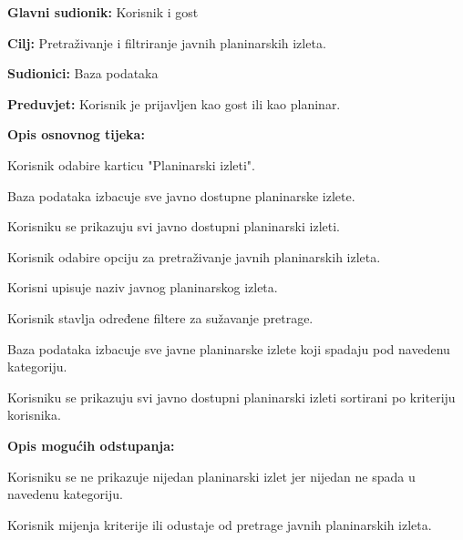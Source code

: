 		\noindent {}
		\begin{packed_item}
			
			\item \textbf{Glavni sudionik: } Korisnik i gost
			\item  \textbf{Cilj:} Pretraživanje i filtriranje javnih planinarskih izleta.
			\item  \textbf{Sudionici:} Baza podataka
			\item  \textbf{Preduvjet:} Korisnik je prijavljen kao gost ili kao planinar.
			\item  \textbf{Opis osnovnog tijeka:}
			
			\item[] \begin{packed_enum}
				
				\item Korisnik odabire karticu "Planinarski izleti".
				\item Baza podataka izbacuje sve javno dostupne planinarske izlete.
				\item Korisniku se prikazuju svi javno dostupni planinarski izleti.
				\item Korisnik odabire opciju za pretraživanje javnih planinarskih izleta.
				\item Korisni upisuje naziv javnog planinarskog izleta.
				\item Korisnik stavlja određene filtere za sužavanje pretrage.
				\item Baza podataka izbacuje sve javne planinarske izlete koji spadaju pod navedenu kategoriju.
				\item Korisniku se prikazuju svi javno dostupni planinarski izleti sortirani po kriteriju korisnika.
				
			\end{packed_enum}
			
			\item	\textbf{Opis mogućih odstupanja:}
			
			\item[] \begin{packed_item}
				
				\item[8.a] Korisniku se ne prikazuje nijedan planinarski izlet jer nijedan ne spada u navedenu kategoriju.
				\item[] \begin{packed_enum}
					
					\item Korisnik mijenja kriterije ili odustaje od pretrage javnih planinarskih izleta.
				\end{packed_enum}
				
			\end{packed_item}
		\end{packed_item}
		
